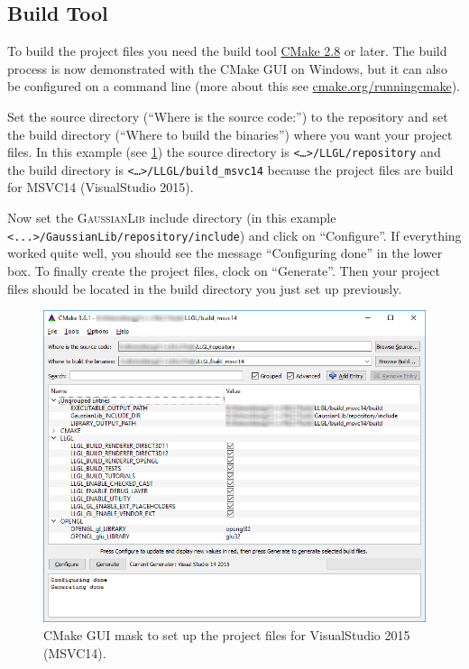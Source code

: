 \documentclass{article}
\begin{document}
\subsection*{Build Tool}

To build the \LLGL project files you need the build tool \href{https://cmake.org/}{CMake 2.8} or later.
The build process is now demonstrated with the CMake GUI on Windows, but it can also be configured
on a command line (more about this see \href{https://cmake.org/runningcmake/}{cmake.org/runningcmake}).

Set the source directory (``Where is the source code:'') to the \LLGL repository
and set the build directory (``Where to build the binaries'') where you want your project files.
In this example (see \ref{fig:cmake_mask1}) the source directory is \texttt{<\dots>/LLGL/repository}
and the build directory is \texttt{<\dots>/LLGL/build\_msvc14} because the project files are build
for MSVC14 (VisualStudio 2015).

Now set the \textsc{GaussianLib} include directory (in this example \texttt{<...>/GaussianLib/repository/include})
and click on ``Configure''. If everything worked quite well, you should see the message ``Configuring done''
in the lower box. To finally create the project files, clock on ``Generate''.
Then your project files should be located in the build directory you just set up previously.

\begin{figure}[H]
	\centering
	\includegraphics[width=0.9 \textwidth]{cmake_mask1}
	\caption{CMake GUI mask to set up the project files for VisualStudio 2015 (MSVC14).}
	\label{fig:cmake_mask1}
\end{figure}
\end{document}

